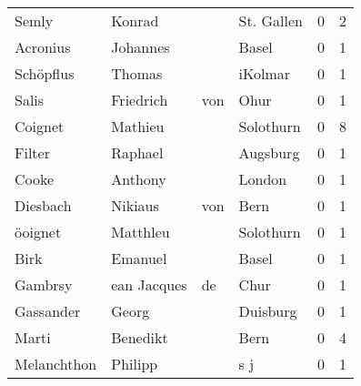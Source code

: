 \begin{tabular}{llllrr}
                    Semly &                             Konrad &             &                                  St. Gallen &          0 &         2 \\
                 Acronius &                           Johannes &             &                                       Basel &          0 &         1 \\
                Schöpflus &                             Thomas &             &                                     iKolmar &          0 &         1 \\
                    Salis &                          Friedrich &         von &                                        Ohur &          0 &         1 \\
                  Coignet &                            Mathieu &             &                                   Solothurn &          0 &         8 \\
                   Filter &                            Raphael &             &                                    Augsburg &          0 &         1 \\
                    Cooke &                            Anthony &             &                                      London &          0 &         1 \\
                 Diesbach &                            Nikiaus &         von &                                        Bern &          0 &         1 \\
                  öoignet &                           Matthleu &             &                                   Solothurn &          0 &         1 \\
                     Birk &                            Emanuel &             &                                       Basel &          0 &         1 \\
                  Gambrsy &                        ean Jacques &          de &                                        Chur &          0 &         1 \\
                Gassander &                              Georg &             &                                    Duisburg &          0 &         1 \\
                    Marti &                           Benedikt &             &                                        Bern &          0 &         4 \\
              Melanchthon &                            Philipp &             &                                         s j &          0 &         1 \\

\end{tabular}
